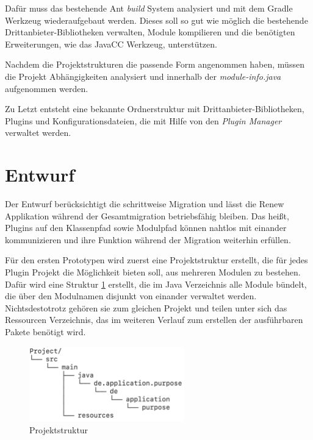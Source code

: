 	Dafür muss das bestehende Ant \textit{build} System analysiert und mit dem Gradle Werkzeug wiederaufgebaut werden. Dieses soll so gut wie möglich die bestehende Drittanbieter-Bibliotheken verwalten, Module kompilieren und die benötigten Erweiterungen, wie das JavaCC Werkzeug, unterstützen.\bigbreak

	Nachdem die Projektstrukturen die passende Form angenommen haben, müssen die Projekt Abhängigkeiten analysiert und innerhalb der \textit{module-info.java} aufgenommen werden.\bigbreak

	Zu Letzt entsteht eine bekannte Ordnerstruktur mit Drittanbieter-Bibliotheken, Plugins und Konfigurationsdateien, die mit Hilfe von den \textit{Plugin Manager} verwaltet werden. 

\section{Entwurf}
	Der Entwurf berücksichtigt die schrittweise Migration und lässt die Renew Applikation während der Gesamtmigration betriebsfähig bleiben. Das heißt, Plugins auf den Klassenpfad sowie Modulpfad können nahtlos mit einander kommunizieren und ihre Funktion während der Migration weiterhin erfüllen.\bigbreak

	Für den ersten Prototypen wird zuerst eine Projektstruktur erstellt, die für jedes Plugin Projekt die Möglichkeit bieten soll, aus mehreren Modulen zu bestehen. Dafür wird eine Struktur \ref{fig:projektstruktur} erstellt, die im Java Verzeichnis alle Module bündelt, die über den Modulnamen disjunkt von einander verwaltet werden. Nichtsdestotrotz gehören sie zum gleichen Projekt und teilen unter sich das Ressourcen Verzeichnis, das im weiteren Verlauf zum erstellen der ausführbaren Pakete benötigt wird.

	\begin{figure}[h!]
	  \centering
	  \includegraphics[width=0.6\textwidth]{material/images/project-structure.png}
	  \caption{Projektstruktur}
	  \label{fig:projektstruktur}
	\end{figure}
	       
